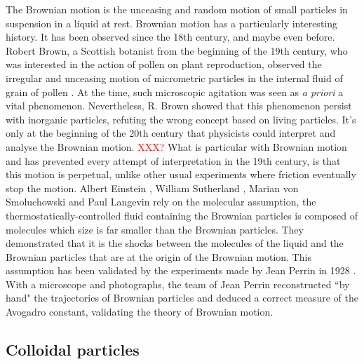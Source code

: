 \documentclass[%
 aip,
 jmp,%
 amsmath,amssymb,
reprint,%
]{revtex4-1}
\begin{document}
The Brownian motion is the unceasing and random motion of small particles in suspension in a liquid at rest. Brownian motion has a particularly interesting history. It has been observed since the 18th century, and maybe even before. Robert Brown, a Scottish botanist from the beginning of the 19th century, who was interested in the action of pollen on plant reproduction, observed the irregular and unceasing motion of micrometric particles in the internal fluid of grain of pollen \citep{13_brown1828brief}. At the time, such microscopic agitation was seen as \textit{a priori} a vital phenomenon. Nevertheless, R. Brown showed that this phenomenon persist with inorganic particles, refuting the wrong concept based on living particles. It's only at the beginning of the 20th century that physicists could interpret and analyse the Brownian motion. \textcolor{red}{XXX?} What is particular with Brownian motion and has prevented every attempt of interpretation in the 19th century, is that this motion is perpetual, unlike other usual experiments where friction eventually stop the motion. Albert Einstein \citep{9_einstein1906theory}, William Sutherland \citep{14_sutherland1905lxxv}, Marian von Smoluchowski \citep{10_von1906kinetischen} and Paul Langevin \citep{15_Langevin} rely on the molecular assumption, the thermostatically-controlled fluid containing the Brownian particles is composed of molecules which size is far smaller than the Brownian particles. They demonstrated that it is the shocks between the molecules of the liquid and the Brownian particles that are at the origin of the Brownian motion. This assumption has been validated by the experiments made by Jean Perrin in 1928 \citep{22_perrin2014atomes}. With a microscope and photographs, the team of Jean Perrin reconstructed ``by hand" the trajectories of Brownian particles and deduced a correct measure of the Avogadro constant, validating the theory of Brownian motion.

\subsection{Colloidal particles}
\end{document}
